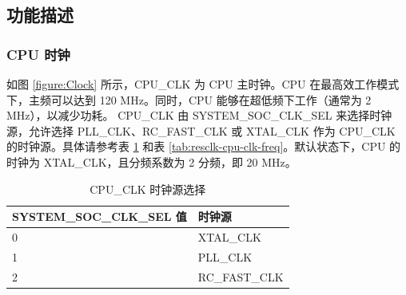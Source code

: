 \documentclass[main\_\_CN.tex]{subfiles}
\begin{document}
\subsection{功能描述}

\subsubsection{CPU 时钟}

如图 \ref{figure:Clock} 所示，CPU\_CLK 为 CPU 主时钟。CPU 在最高效工作模式下，主频可以达到 120 MHz。同时，CPU 能够在超低频下工作（通常为 2 MHz），以减少功耗。
CPU\_CLK 由 SYSTEM\_SOC\_CLK\_SEL 来选择时钟源，允许选择 PLL\_CLK、RC\_FAST\_CLK 或 XTAL\_CLK 作为 CPU\_CLK 的时钟源。具体请参考表 \ref{tab:resclk-cpu-clk-src} 和表 \ref{tab:resclk-cpu-clk-freq}。默认状态下，CPU 的时钟为 XTAL\_CLK，且分频系数为 2 分频，即 20 MHz。
\begin{longtable}[c]{|p{5cm}|p{5cm}| }
       \caption{CPU\_CLK 时钟源选择}
		\label{tab:resclk-cpu-clk-src} \\
	    \hline
        \rowcolor{lightgray}
        \textbf{SYSTEM\_SOC\_CLK\_SEL 值} & \textbf{时钟源} \\
        \hline
        0 & XTAL\_CLK \\
        \hline
        1 & PLL\_CLK \\
        \hline
        2 & RC\_FAST\_CLK \\
        \hline
\end{longtable}
\end{document}

